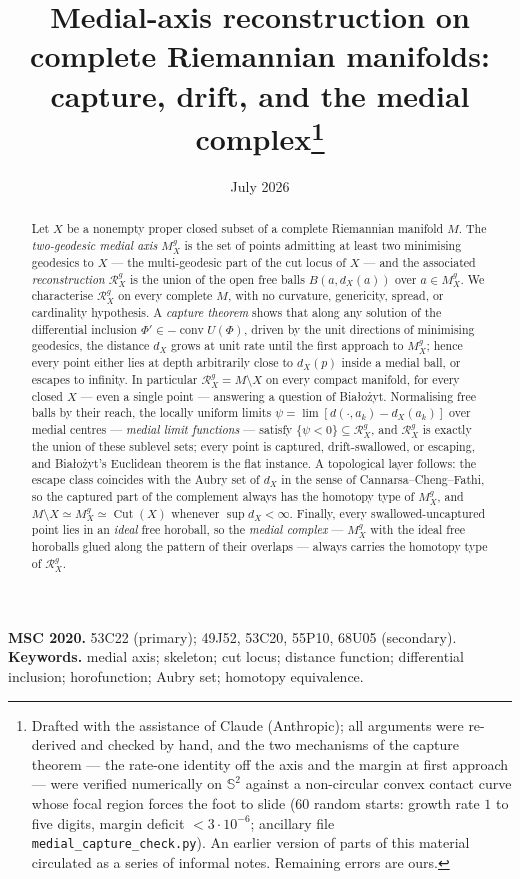 \documentclass[11pt]{article}
\title{Medial-axis reconstruction on complete Riemannian
manifolds:\\ capture, drift, and the medial
complex\thanks{Drafted with the assistance of Claude (Anthropic);
all arguments were re-derived and checked by hand, and the two
mechanisms of the capture theorem --- the rate-one identity off the
axis and the margin at first approach --- were verified numerically
on $\mathbb{S}^{2}$ against a non-circular convex contact curve
whose focal region forces the foot to slide (60 random starts:
growth rate $1$ to five digits, margin deficit $<3\cdot10^{-6}$;
ancillary file \texttt{medial\_capture\_check.py}). An earlier
version of parts of this material circulated as a series of
informal notes. Remaining errors are ours.}}
\author{}
\date{July 2026}
\theoremstyle{remark}
\newcommand{\X}{X}
\newcommand{\Mg}{M^{g}_{\X}}
\newcommand{\Rg}{\mathcal{R}^{g}_{\X}}
\newcommand{\dX}{d_{\X}}
\newcommand{\conv}{\operatorname{conv}}
\newcommand{\Cut}{\operatorname{Cut}}
\begin{document}
\maketitle

\begin{abstract}
Let $\X$ be a nonempty proper closed subset of a complete Riemannian
manifold $M$. The \emph{two-geodesic medial axis} $\Mg$ is the set of
points admitting at least two minimising geodesics to $\X$ --- the
multi-geodesic part of the cut locus of $\X$ --- and the associated
\emph{reconstruction} $\Rg$ is the union of the open free balls
$B(a,\dX(a))$ over $a\in\Mg$. We characterise $\Rg$ on every complete
$M$, with no curvature, genericity, spread, or cardinality
hypothesis. A \emph{capture theorem} shows that along any solution of
the differential inclusion $\Phi'\in-\conv U(\Phi)$, driven by the
unit directions of minimising geodesics, the distance $\dX$ grows at
unit rate until the first approach to $\Mg$; hence every point either
lies at depth arbitrarily close to $\dX(p)$ inside a medial ball, or
escapes to infinity. In particular $\Rg=M\setminus\X$ on every
compact manifold, for every closed $\X$ --- even a single point ---
answering a question of Bia\l{}o\.zyt. Normalising free balls by
their reach, the locally uniform limits
$\psi=\lim[d(\cdot,a_{k})-\dX(a_{k})]$ over medial centres ---
\emph{medial limit functions} --- satisfy $\{\psi<0\}\subseteq\Rg$,
and $\Rg$ is exactly the union of these sublevel sets; every point is
captured, drift-swallowed, or escaping, and Bia\l{}o\.zyt's Euclidean
theorem is the flat instance. A topological layer follows: the escape
class coincides with the Aubry set of $\dX$ in the sense of
Cannarsa--Cheng--Fathi, so the captured part of the complement always
has the homotopy type of $\Mg$, and
$M\setminus\X\simeq\Mg\simeq\Cut(\X)$ whenever $\sup\dX<\infty$.
Finally, every swallowed-uncaptured point lies in an \emph{ideal}
free horoball, so the \emph{medial complex} --- $\Mg$ with the ideal
free horoballs glued along the pattern of their overlaps --- always
carries the homotopy type of $\Rg$.
\end{abstract}

\medskip
{\small\noindent\textbf{MSC 2020.} 53C22 (primary); 49J52, 53C20,
55P10, 68U05 (secondary).\\
\textbf{Keywords.} medial axis; skeleton; cut locus; distance
function; differential inclusion; horofunction; Aubry set; homotopy
equivalence.}

\tableofcontents
\end{document}
